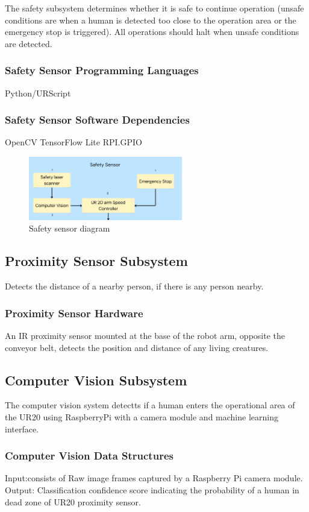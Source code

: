 
The safety subsystem determines whether it is safe to continue operation (unsafe conditions are when a human is detected too close to the operation area or the emergency stop is triggered). All operations should halt when unsafe conditions are detected.

\subsubsection{Safety Sensor Programming Languages}
Python/URScript

\subsubsection{Safety Sensor Software Dependencies}
OpenCV
TensorFlow Lite
RPI.GPIO

\begin{figure}[h!]
	\centering
 	\includegraphics[width=0.60\textwidth]{images/safety.png}
 \caption{Safety sensor diagram}
\end{figure}

\subsection{Proximity Sensor Subsystem}
Detects the distance of a nearby person, if there is any person nearby.

\subsubsection{Proximity Sensor Hardware}
An IR proximity sensor mounted at the base of the robot arm, opposite the conveyor belt, detects the position and distance of any living creatures.


\subsection{Computer Vision Subsystem}
The computer vision system detectts if a human enters the operational area of the UR20 using RaspberryPi with a camera module and machine learning interface.
\subsubsection{Computer Vision Data Structures}
Input:consists of Raw image frames captured by a Raspberry Pi camera module.
Output: Classification confidence score indicating the probability of a human in dead zone of UR20 proximity sensor.


